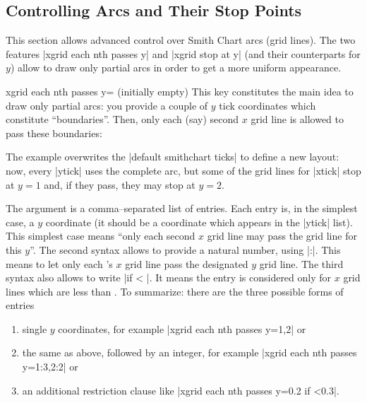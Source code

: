 \subsection{Controlling Arcs and Their Stop Points}
This section allows advanced control over Smith Chart arcs (grid lines). The two features |xgrid each nth passes y| and |xgrid stop at y| (and their counterparts for $y$) allow to draw only partial arcs in order to get a more uniform appearance.

\begin{pgfplotskey}{xgrid each nth passes y= (initially empty)}
	This key constitutes the main idea to draw only partial arcs: you provide a couple of $y$ tick coordinates which constitute ``boundaries''. Then, only each (say) second $x$ grid line is allowed to pass these boundaries:
\begin{codeexample}[]
\begin{tikzpicture}
	\begin{smithchart}[
		xtick={0.2,0.5,1,2,5},
		ytick={
			0,
			 0.2, 0.5, 1, 2, 5,
			-0.2,-0.5,-1,-2,-5},
		xgrid each nth passes y={1,2},
	]
	\end{smithchart}
\end{tikzpicture}
\end{codeexample}
	The example overwrites the |default smithchart ticks| to define a new layout: now, every |ytick| uses the complete arc, but some of the grid lines for |xtick| stop at $y=1$ and, if they pass, they may stop at $y=2$.

	The argument  is a comma--separated list of entries. Each entry is, in the simplest case, a $y$ coordinate (it should be a coordinate which appears in the |ytick| list). This simplest case means ``only each second $x$ grid line may pass the grid line for this $y$''. The second syntax allows to provide a natural number, using |:|. This means to let only each 's $x$ grid line pass the designated $y$ grid line. The third syntax also allows to write |if < |. It means the entry is considered only for $x$ grid lines which are less than . To summarize: there are the three possible forms of entries
	\begin{enumerate}
		\item single $y$ coordinates, for example |xgrid each nth passes y={1,2}| or
		\item the same as above, followed by an integer, for example |xgrid each nth passes y={1:3,2:2}| or
		\item an additional restriction clause like |xgrid each nth passes y={0.2 if <0.3}|. 
		

\end{enumerate}
\end{pgfplotskey}
